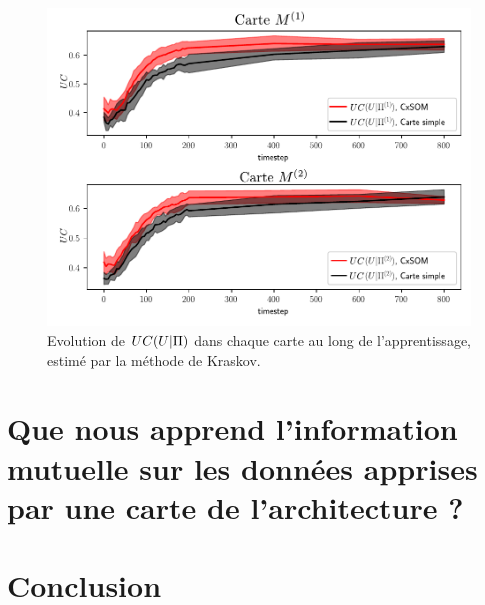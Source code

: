 \documentclass[../main]{subfiles}
\begin{document}
\begin{figure}
\includegraphics[width=\textwidth]{evolution_MI_K}
\caption{Evolution de $UC(U|\Pi)$ dans chaque carte au long de l'apprentissage, estimé par la méthode de Kraskov.\label{fig:MI_evol_total}}

\end{figure}

\section{Que nous apprend l'information mutuelle sur les données apprises par une carte de l'architecture ?}



\section{Conclusion}
\end{document}
